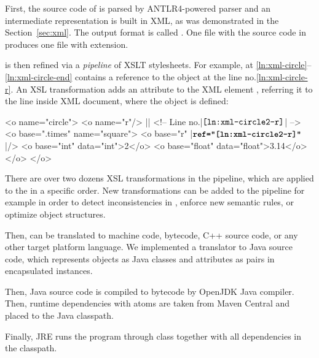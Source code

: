 First, the source code of \eolang{} is parsed by ANTLR4-powered
parser and an intermediate representation is built in XML,
as was demonstrated in the Section~\ref{sec:xml}.
The output format is called \xmir{}.
One  file with
the source code in \eolang{} produces one \xmir{} file with  extension.

\xmir{} is then refined via a \emph{pipeline} of XSLT stylesheets.
For example, \xmir{} at \ref{ln:xml-circle}--\ref{ln:xml-circle-end} contains a
reference to the object  at the line no.\ref{ln:xml-circle-r}.
An XSL transformation adds an attribute  to the XML element ,
referring it to the line inside XML document, where the object  is defined:

\begin{ffcode}
<o name="circle">
  <o name="r"/> |\(\label{ln:xml-circle2-r}\)| <!-- Line no.|\(\texttt{\ref{ln:xml-circle2-r}}\)| -->
  <o base=".times" name="square">
    <o base="r" |\(\textbf{\texttt{ref="\ref{ln:xml-circle2-r}"}}\)|/>
    <o base="int" data="int">2</o>
    <o base="float" data="float">3.14</o>
  </o>
</o>
\end{ffcode}

There are over two dozens XSL transformations in the pipeline, which
are applied to the \xmir{} in a specific order. New transformations can
be added to the pipeline for example in order to detect inconsistencies
in \xmir{}, enforce new semantic rules, or optimize object structures.

Then, \xmir{} can be translated to machine code, bytecode, C++ source code,
or any other target platform language. We implemented
a translator to Java source code, which represents
\xmir{} objects as Java classes and attributes as pairs in encapsulated
 instances.

Then, Java source code is compiled to bytecode by OpenJDK Java compiler.
Then, runtime dependencies with atoms are taken from Maven Central
and placed to the Java classpath.

Finally, JRE runs the program through  class together with
all  dependencies in the classpath.

